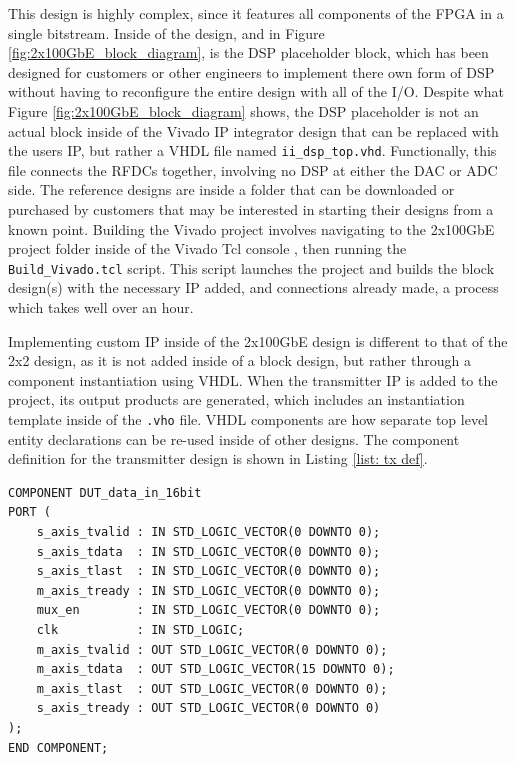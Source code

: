 \documentclass[12pt, a4paper]{article}
\begin{document}
This design is highly complex, since it features all components of the FPGA in a single bitstream. Inside of the design, and in Figure \ref{fig:2x100GbE_block_diagram}, is the DSP placeholder block, which has been designed for customers or other engineers to implement there own form of DSP without having to reconfigure the entire design with all of the I/O. Despite what Figure \ref{fig:2x100GbE_block_diagram} shows, the DSP placeholder is not an actual block inside of the Vivado IP integrator design that can be replaced with the users IP, but rather a VHDL file named \texttt{ii\_dsp\_top.vhd}. Functionally, this file connects the RFDCs together, involving no DSP at either the DAC or ADC side. The reference designs are inside a folder that can be downloaded or purchased by customers that may be interested in starting their designs from a known point. Building the Vivado project involves navigating to the 2x100GbE project folder inside of the Vivado Tcl console \cite{AMD_Vivado_Tcl}, then running the \texttt{Build\_Vivado.tcl} script. This script launches the project and builds the block design(s) with the necessary IP added, and connections already made, a process which takes well over an hour.

Implementing custom IP inside of the 2x100GbE design is different to that of the 2x2 design, as it is not added inside of a block design, but rather through a component instantiation using VHDL. When the transmitter IP is added to the project, its output products are generated, which includes an instantiation template inside of the \texttt{.vho} file. VHDL components are how separate top level entity declarations can be re-used inside of other designs. The component definition for the transmitter design is shown in Listing \ref{list: tx def}.

\begin{listing}[h!]
\begin{verbatim}
COMPONENT DUT_data_in_16bit
PORT (
    s_axis_tvalid : IN STD_LOGIC_VECTOR(0 DOWNTO 0);
    s_axis_tdata  : IN STD_LOGIC_VECTOR(0 DOWNTO 0);
    s_axis_tlast  : IN STD_LOGIC_VECTOR(0 DOWNTO 0);
    m_axis_tready : IN STD_LOGIC_VECTOR(0 DOWNTO 0);
    mux_en        : IN STD_LOGIC_VECTOR(0 DOWNTO 0);
    clk           : IN STD_LOGIC;
    m_axis_tvalid : OUT STD_LOGIC_VECTOR(0 DOWNTO 0);
    m_axis_tdata  : OUT STD_LOGIC_VECTOR(15 DOWNTO 0);
    m_axis_tlast  : OUT STD_LOGIC_VECTOR(0 DOWNTO 0);
    s_axis_tready : OUT STD_LOGIC_VECTOR(0 DOWNTO 0)
);
END COMPONENT;

\end{verbatim}
\caption{Transmitter Component Definition}
\label{list: tx def}
\end{listing}
\end{document}
